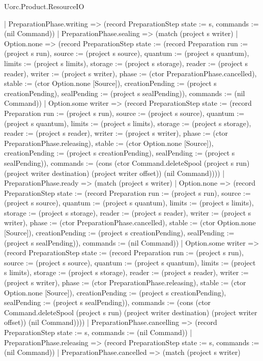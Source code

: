\begin{lexlean}{Uorc.Product.ResourceIO}
\begin{semanticmodule}
{    | PreparationPhase.writing => (record PreparationStep {state := s, commands := (nil Command)})
    | PreparationPhase.sealing => (match (project s writer)
      | Option.none => (record PreparationStep {state := (record Preparation {run := (project s run), source := (project s source), quantum := (project s quantum), limits := (project s limits), storage := (project s storage), reader := (project s reader), writer := (project s writer), phase := (ctor PreparationPhase.cancelled), stable := (ctor Option.none [Source]), creationPending := (project s creationPending), sealPending := (project s sealPending)}), commands := (nil Command)})
      | Option.some writer => (record PreparationStep {state := (record Preparation {run := (project s run), source := (project s source), quantum := (project s quantum), limits := (project s limits), storage := (project s storage), reader := (project s reader), writer := (project s writer), phase := (ctor PreparationPhase.releasing), stable := (ctor Option.none [Source]), creationPending := (project s creationPending), sealPending := (project s sealPending)}), commands := (cons (ctor Command.deleteSpool (project s run) (project writer destination) (project writer offset)) (nil Command))}))
    | PreparationPhase.ready => (match (project s writer)
      | Option.none => (record PreparationStep {state := (record Preparation {run := (project s run), source := (project s source), quantum := (project s quantum), limits := (project s limits), storage := (project s storage), reader := (project s reader), writer := (project s writer), phase := (ctor PreparationPhase.cancelled), stable := (ctor Option.none [Source]), creationPending := (project s creationPending), sealPending := (project s sealPending)}), commands := (nil Command)})
      | Option.some writer => (record PreparationStep {state := (record Preparation {run := (project s run), source := (project s source), quantum := (project s quantum), limits := (project s limits), storage := (project s storage), reader := (project s reader), writer := (project s writer), phase := (ctor PreparationPhase.releasing), stable := (ctor Option.none [Source]), creationPending := (project s creationPending), sealPending := (project s sealPending)}), commands := (cons (ctor Command.deleteSpool (project s run) (project writer destination) (project writer offset)) (nil Command))}))
    | PreparationPhase.cancelling => (record PreparationStep {state := s, commands := (nil Command)})
    | PreparationPhase.releasing => (record PreparationStep {state := s, commands := (nil Command)})
    | PreparationPhase.cancelled => (match (project s writer)
}
\end{semanticmodule}
\end{lexlean}
